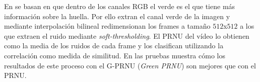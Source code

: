 En \cite{gprnu:2016} se basan en que dentro de los canales RGB el verde es el que tiene más información sobre la huella. Por ello extran el canal verde de la imagen y mediante interpolación bilineal redimensionan los frames a tama\~no $512$x$512$ a los que extraen el ruido mediante \textit{soft-thresholding}. El PRNU del vídeo lo obtienen como la media de los ruidos de cada frame y los clasifican utilizando la correlación como medida de similitud. En las pruebas muestra cómo los resultados de este proceso con el G-PRNU (\textit{Green PRNU}) son mejores que con el PRNU. \\
